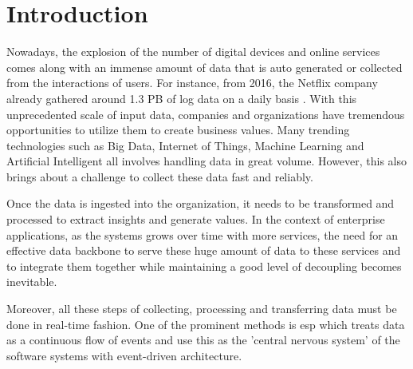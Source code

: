 \chapter{Introduction} \label{chap:intro}
Nowadays, the explosion of the number of digital devices and online services comes along with an immense amount of data that is auto generated or collected from the interactions of users. For instance, from 2016, the Netflix company already gathered around 1.3 PB of log data on a daily basis \cite{netflixpipeline}. With this unprecedented scale of input data, companies and organizations have tremendous opportunities to utilize them to create business values. Many trending technologies such as Big Data, Internet of Things, Machine Learning and Artificial Intelligent all involves handling data in great volume. However, this also brings about a challenge to collect these data fast and reliably.


Once the data is ingested into the organization, it needs to be transformed  and processed to extract insights and generate values. In the context of enterprise applications, as the systems grows over time with more services, the need for an effective data backbone to serve these huge amount of data to these services and to integrate them together while maintaining a good level of decoupling becomes inevitable.

Moreover, all these steps of collecting, processing and transferring data must be done in real-time fashion. One of the prominent methods is \acrfull{esp} which treats data as a continuous flow of events and use this as the 'central nervous system' of the software systems with event-driven architecture.

